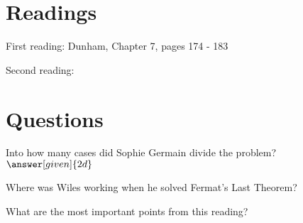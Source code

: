 \documentclass[nooutcomes]{ximera}
\begin{document}
\section{Readings}
First reading: Dunham, Chapter 7, pages 174 - 183

Second reading: 



\section{Questions}

\begin{question}
Into how many cases did Sophie Germain divide the problem? $\answer[given]{2d}$
\end{question}

\begin{question}
Where was Wiles working when he solved Fermat's Last Theorem?
\begin{multipleChoice}
\end{multipleChoice}
\end{question}


\begin{question}
What are the most important points from this reading?
\begin{freeResponse}
\end{freeResponse}

\end{question}
\end{document}
